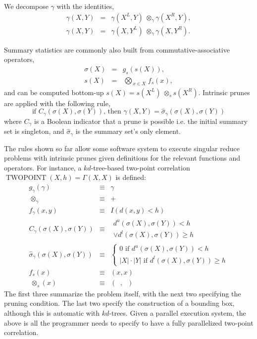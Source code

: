 \documentclass[times, leqno,twocolumn]{article}
\newcommand{\bigvec}[1]{\mathop{\overrightarrow{#1}}}
\newcommand{\summary}{\hat{\sigma}}
\DeclareMathOperator{\TWOPT}{TWOPOINT}
\newcommand{\kdleft}[1]{#1^{\!L}}
\newcommand{\kdright}[1]{#1^{\!R}}
\newcommand{\lo}[1]{#1^{l}}
\newcommand{\up}[1]{#1^{u}}
\newcommand{\distlo}{\lo{d}}
\newcommand{\distup}{\up{d}}
\newcommand{\dist}[2]{d(#1,#2)}
\newcommand{\nameOp}[2]{\mathop{#1\nolimits\!\!_{#2}}}
\newcommand{\nameop}[2]{{\scriptstyle\:}#1_{\!#2}}
\newcommand{\myOp}[1]{\nameOp{\bigotimes}{#1}}
\newcommand{\myop}[1]{\nameop{\otimes}{#1}}
\newcommand{\letterglob}{\gamma}
\newcommand{\outglob}{\Gamma}
\newcommand{\inglob}{\gamma}
\newcommand{\opglob}{\myop{\letterglob}}
\newcommand{\fglob}{f_{\!\letterglob}}
\newcommand{\gglob}{g_{\!\letterglob}}
\newcommand{\canpruneglob}{C_{\!\letterglob}}
\newcommand{\deltaglob}{\summary_{\!\letterglob}}
\newcommand{\letterstat}{s}
\newcommand{\outstat}{\sigma}
\newcommand{\instat}{s}
\newcommand{\Opstat}{\myOp{\letterstat}}
\newcommand{\opstat}{\myop{\letterstat}}
\newcommand{\fstat}{f_{\!\letterstat}}
\newcommand{\gstat}{g_{\!\letterstat}}
\begin{document}
\noindent We decompose $\inglob$ with the identities,
\begin{eqnarray*}
\inglob(X, Y) &=& \inglob(\kdleft{X}, Y) \opglob \inglob(\kdright{X}, Y),
\\
\inglob(X, Y) &=& \inglob(X, \kdleft{Y}) \opglob \inglob(X, \kdright{Y}).
\label{eqn:divideglob}
\end{eqnarray*}

\noindent Summary statistics are commonly also built from commutative-associative operators,
\begin{eqnarray*}
\outstat(X) &=& \gstat(\instat(X)),
\\
\instat(X) &=& \Opstat_{x \in X} \fstat(x),
\label{eqn:defstat}
\end{eqnarray*}
\noindent and can be computed bottom-up $\instat(X) = \instat(\kdleft{X}) \opstat \instat(\kdright{X})$.
Intrinsic prunes are applied with the following rule,
\begin{equation*}
\text{if } \canpruneglob(\outstat(X), \outstat(Y)) \text{, then } \inglob(X, Y) = \deltaglob(\outstat(X), \outstat(Y))
\label{eqn:intrinsic}
\end{equation*}
\noindent where $\canpruneglob$ is a Boolean indicator that a prune is possible i.e. the initial summary set is singleton, and $\deltaglob$ is the summary set's only element.

The rules shown so far allow some software system to execute singular reduce problems with intrinsic prunes given definitions for the relevant functions and operators.
For instance, a $kd$-tree-based two-point correlation $\TWOPT(X, h)= \outglob(X,X)$ is defined:
\begin{eqnarray*}
\label{eqn:tpc_gglob}
\gglob(\inglob) &\equiv& \inglob
\\
\label{eqn:tpc_opglob}
\opglob &\equiv& +
\\
\label{eqn:tpc_fglob}
\fglob(x,y) &\equiv& I(\dist{x}{y} < h)
\\
\label{eqn:tpc_canpruneglob}
\canpruneglob(\sigma(X), \sigma(Y))
&\equiv&
\begin{array}{l}\distup(\outstat(X),\outstat(Y)) < h \\ \vee \distlo(\outstat(X),\outstat(Y)) \geq h\end{array}
\\
\label{eqn:tpc_deltaglob}
\deltaglob(\outstat(X),\outstat(Y)) &\equiv& \left\{ \begin{array}{l} 0 \text{ if } \distup(\outstat(X),\outstat(Y)) < h \\ |X|\cdot|Y| \text{ if } \distlo(\outstat(X),\outstat(Y)) \geq h \end{array}\right.
\\
\label{eqn:tpc_fstat}
\fstat(x) &\equiv& (x,x)
\\
\label{eqn:tpc_opstat}
\opstat(x) &\equiv& \left( \bigvec{\min} , \bigvec{\max} \right)
\end{eqnarray*}
\noindent The first three summarize the problem itself, with the next two specifying the pruning condition.
The last two specify the construction of a bounding box, although this is automatic with $kd$-trees.
Given a parallel execution system, the above is all the programmer needs to specify to have a fully parallelized two-point correlation.
\end{document}
